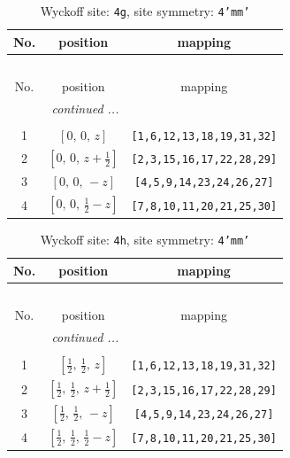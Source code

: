 \documentclass[fleqn,8pt]{jsarticle}
\begin{document}
\renewcommand{\arraystretch}{1.2}
\begin{longtable}{ccc}
\caption{Wyckoff site: {\tt 4g}, site symmetry: {\tt 4'mm'}}
 \\
 \hline \hline
No. & position & mapping \\ \hline \endfirsthead

\multicolumn{2}{l}{\tablename\ \thetable{}} \\
 \hline \hline
No. & position & mapping \\ \hline \endhead

 \hline \hline
\multicolumn{2}{r}{\footnotesize\it continued ...} \\ \endfoot

 \hline \hline
\multicolumn{2}{r}{} \\ \endlastfoot

1 & $\left[ 0,\, 0,\, z \right]$ & {\tt [1,6,12,13,18,19,31,32]} \\ \hline
2 & $\left[ 0,\, 0,\, z + \frac{1}{2} \right]$ & {\tt [2,3,15,16,17,22,28,29]} \\ \hline
3 & $\left[ 0,\, 0,\, - z \right]$ & {\tt [4,5,9,14,23,24,26,27]} \\ \hline
4 & $\left[ 0,\, 0,\, \frac{1}{2} - z \right]$ & {\tt [7,8,10,11,20,21,25,30]} \\
\end{longtable}
\renewcommand{\arraystretch}{1.2}
\begin{longtable}{ccc}
\caption{Wyckoff site: {\tt 4h}, site symmetry: {\tt 4'mm'}}
 \\
 \hline \hline
No. & position & mapping \\ \hline \endfirsthead

\multicolumn{2}{l}{\tablename\ \thetable{}} \\
 \hline \hline
No. & position & mapping \\ \hline \endhead

 \hline \hline
\multicolumn{2}{r}{\footnotesize\it continued ...} \\ \endfoot

 \hline \hline
\multicolumn{2}{r}{} \\ \endlastfoot

1 & $\left[ \frac{1}{2},\, \frac{1}{2},\, z \right]$ & {\tt [1,6,12,13,18,19,31,32]} \\ \hline
2 & $\left[ \frac{1}{2},\, \frac{1}{2},\, z + \frac{1}{2} \right]$ & {\tt [2,3,15,16,17,22,28,29]} \\ \hline
3 & $\left[ \frac{1}{2},\, \frac{1}{2},\, - z \right]$ & {\tt [4,5,9,14,23,24,26,27]} \\ \hline
4 & $\left[ \frac{1}{2},\, \frac{1}{2},\, \frac{1}{2} - z \right]$ & {\tt [7,8,10,11,20,21,25,30]} \\
\end{longtable}
\end{document}
